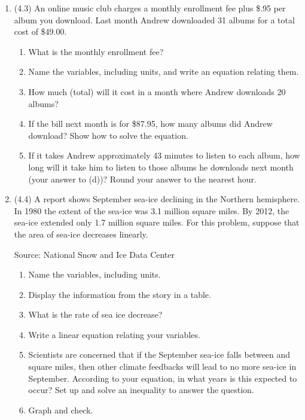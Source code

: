 \documentclass[12pt]{article}
\begin{document}
\begin{enumerate}
\item (4.3) An online music club charges a monthly enrollment fee plus \$.95 per album you download.  Last month Andrew downloaded 31 albums for a total cost of \$49.00.  
\begin{enumerate}
\item What is the monthly enrollment fee?
\item Name the variables, including units, and write an equation relating them.
\item How much (total) will it cost  in a month where Andrew downloads 20 albums?
\item If the bill next month is for \$87.95, how many albums did Andrew download? Show how to solve the equation.
\item If it takes Andrew approximately 43 minutes to listen to each album, how long will it take him to listen to those albums he downloads next month (your answer to (d))?  Round your answer to the nearest hour.
\end{enumerate}

\item (4.4) A report  shows September sea-ice declining in the Northern hemisphere. In 1980 the extent of the sea-ice was 3.1 million square miles.  By 2012, the sea-ice extended only 1.7 million square miles.  For this problem, suppose that the area of sea-ice decreases linearly. 
\hfill \begin{footnotesize} Source: National Snow and Ice Data Center \end{footnotesize}
\begin{enumerate}
\item Name the variables, including units.
\item Display the information from the story in a table.
\item What is the rate of sea ice decrease? 
\item Write a linear equation relating your variables.
\item Scientists are concerned that if the September sea-ice falls between  and  square miles, then other climate feedbacks will lead to no more sea-ice in September.  According to your equation, in what years is this expected to occur?  Set up and solve an inequality to answer the question.
\item Graph and check.
\end{enumerate}


\end{enumerate}
\end{document}
